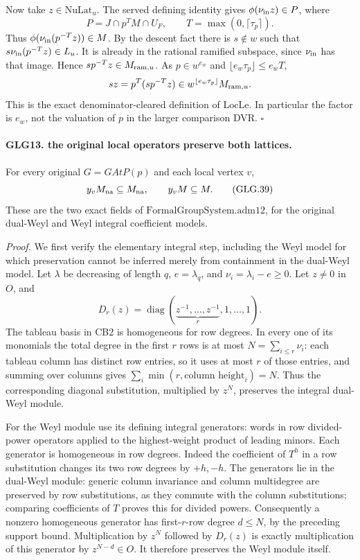 Now take \(z\in\mathrm{NuLat}_u\).
The served defining identity gives
\(\phi(\nu_{\rm in}z)\in P\), where
\[
                  P=J\cap p^T M\cap U_F,\qquad
                  T=\max(0,\lceil\tau_p\rceil).
 \]
Thus \(\phi(\nu_{\rm in}(p^{-T}z))\in M\).
By the descent fact there is \(s\notin w\) such that
\(s\nu_{\rm in}(p^{-T}z)\in L_u\). It is already in the
rational ramified subspace, since \(\nu_{\rm in}\) has
that image. Hence \(sp^{-T}z\in M_{{\rm ram},u}\).
As \(p\in w^{e_w}\) and
\(\lfloor e_w\tau_p\rfloor\le e_wT\),
\[
          sz=p^T(sp^{-T}z)
                     \in w^{\lfloor e_w\tau_p\rfloor}
                                          M_{{\rm ram},u}.
 \]
This is the exact denominator-cleared definition of
\(\mathrm{LocLe}\). In particular the factor is \(e_w\),
not the valuation of \(p\) in the larger comparison DVR.
\hfill\(\square\)

\paragraph{GLG13. the original local operators preserve both lattices.}
\label{claim:GLG13}
For every original \(G=GAtP(p)\) and each local vertex \(v\),
\[
                        y_vM_{\rm na}\subseteq M_{\rm na},
                  \qquad y_vM\subseteq M .                        \tag{GLG.39}
\]
These are the two exact fields of
\(\mathrm{FormalGroupSystem.adm12}\), for the original
dual-Weyl and Weyl integral coefficient models.

\emph{Proof.}
We first verify the elementary integral step, including the
Weyl model for which preservation cannot be inferred merely
from containment in the dual-Weyl model. Let \(\lambda\) be
decreasing of length \(q\), \(e=\lambda_q\), and
\(\nu_i=\lambda_i-e\ge0\). Let \(z\ne0\) in \(O\), and
\[
                 D_r(z)=\operatorname{diag}
                         (\underbrace{z^{-1},\ldots,z^{-1}}_r,
                                           1,\ldots,1).
 \]
The tableau basis in CB2 is homogeneous for row degrees.
In every one of its monomials the total degree in the
first \(r\) rows is at most \(N=\sum_{i\le r}\nu_i\):
each tableau column has distinct row entries, so it uses
at most \(r\) of those entries, and summing over columns
gives \(\sum_i\min(r,\text{column height}_i)=N\).
Thus the corresponding diagonal substitution, multiplied
by \(z^N\), preserves the integral dual-Weyl module.

For the Weyl module use its defining integral generators:
words in row divided-power operators applied to the
highest-weight product of leading minors. Each generator
is homogeneous in row degrees. Indeed the coefficient
of \(T^h\) in a row substitution changes its two row
degrees by \(+h,-h\). The generators lie in the dual-Weyl
module: generic column invariance and column multidegree
are preserved by row substitutions, as they commute
with the column substitutions; comparing coefficients
of \(T\) proves this for divided powers. Consequently a
nonzero homogeneous generator has first-\(r\)-row degree
\(d\le N\), by the preceding support bound. Multiplication
by \(z^N\) followed by \(D_r(z)\) is exactly multiplication
of this generator by \(z^{N-d}\in O\). It therefore
preserves the Weyl module itself.

